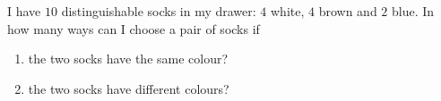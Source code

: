 I have $10$ distinguishable socks in my drawer: $4$ white, $4$ brown and $2$ blue. In how many ways can I choose a pair of socks if
\begin{enumerate}
\item[(a)] the two socks have the same colour?
\item[(b)] the two socks have different colours?
\end{enumerate}
